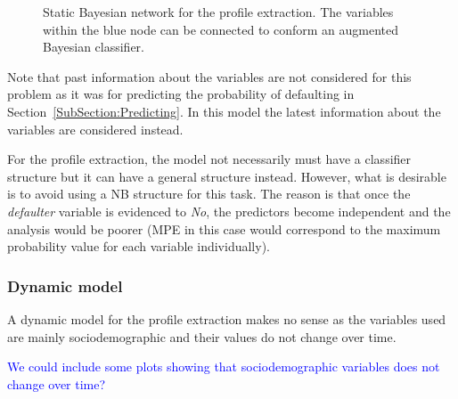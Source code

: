 \begin{figure}[h]

\centering
{}
\caption{Static Bayesian network for the profile extraction. The variables within the blue node can be connected to conform an augmented Bayesian classifier.}
\label{fig:StaticBNProfile}
\end{figure}


Note that past information about the variables are not considered for this problem as it was for predicting the probability of defaulting in Section~\ref{SubSection:Predicting}. In this model the latest information about the variables are considered instead.

For the profile extraction, the model not necessarily must have a classifier structure but it can have a general structure instead. However, what is desirable is to avoid using a NB structure for this task. The reason is that once the \emph{defaulter} variable is evidenced to \emph{No}, the predictors become independent and the analysis would be poorer (MPE in this case would correspond to the maximum probability value for each variable individually).



\subsubsection*{Dynamic model}

A dynamic model for the profile extraction makes no sense as the variables used are mainly sociodemographic and their values do not change over time.

\textcolor{blue}{We could include some plots showing that sociodemographic variables does not change over time?}

